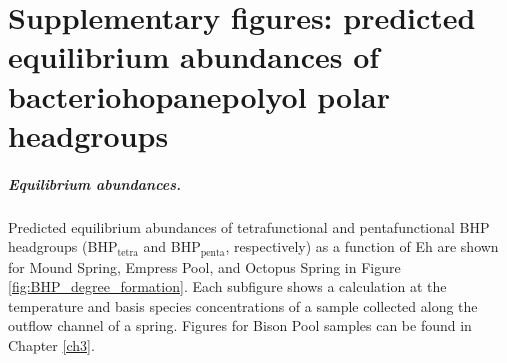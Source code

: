 \chapter{Supplementary figures: predicted equilibrium abundances of bacteriohopanepolyol polar headgroups}\label{app3}

\clearpage

\paragraph*{Equilibrium abundances.} Predicted equilibrium abundances of tetrafunctional and pentafunctional BHP headgroups (BHP$_{\text{tetra}}$ and BHP$_{\text{penta}}$, respectively) as a function of Eh are shown for Mound Spring, Empress Pool, and Octopus Spring in Figure \ref{fig:BHP_degree_formation}. Each subfigure shows a calculation at the temperature and basis species concentrations of a sample collected along the outflow channel of a spring. Figures for Bison Pool samples can be found in Chapter \ref{ch3}.


